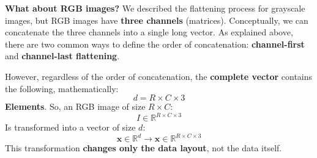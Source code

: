 \highspace
\textcolor{Green3}{ \textbf{What about RGB images?}} We described the flattening process for grayscale images, but RGB images have \textbf{three channels} (matrices). Conceptually, we can concatenate the three channels into a single long vector. As explained above, there are two common ways to define the order of concatenation: \textbf{channel-first} and \textbf{channel-last flattening}.

\highspace
However, regardless of the order of concatenation, the \textbf{complete vector} contains the following, mathematically:
\begin{equation*}
    d = R \times C \times 3
\end{equation*}
\textbf{Elements}. So, an RGB image of size $R \times C$:
\begin{equation*}
    I \in \mathbb{R}^{R \times C \times 3}
\end{equation*}
Is transformed into a vector of size $d$:
\begin{equation*}
    \mathbf{x} \in \mathbb{R}^{d} \to \mathbf{x} \in \mathbb{R}^{R \times C \times 3}
\end{equation*}
This transformation \textbf{changes only the data layout}, not the data itself.

